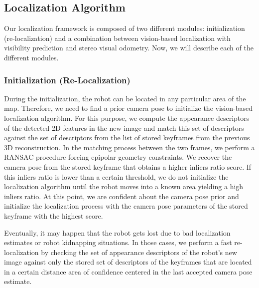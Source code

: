 \documentclass[conference]{IEEEtran}
\begin{document}
\subsection{Localization Algorithm}\label{sec:localization_algorithm}
Our localization framework is composed of two different modules: initialization (re-localization) and a combination between vision-based localization with visibility prediction and stereo visual odometry. Now, we will describe each of the different modules.

\subsubsection{Initialization (Re-Localization)}
During the initialization, the robot can be located in any particular area of the map. Therefore, we need to find a prior camera pose to initialize the vision-based localization algorithm. For this purpose, we compute the appearance descriptors of the detected 2D features in the new image and match this set of descriptors against the set of descriptors from the list of stored keyframes from the previous 3D reconstruction. In the matching process between the two frames, we perform a RANSAC procedure forcing epipolar geometry constraints. We recover the camera pose from the stored keyframe that obtains a higher inliers ratio score. If this inliers ratio is lower than a certain threshold, we do not initialize the localization algorithm until the robot moves into a known area yielding a high inliers ratio. At this point, we are confident about the camera pose prior and initialize the localization process with the camera pose parameters of the stored keyframe with the highest score.

Eventually, it may happen that the robot gets lost due to bad localization estimates or robot kidnapping situations. In those cases, we perform a fast re-localization by checking the set of appearance descriptors of the robot's new image against only the stored set of descriptors of the keyframes that are located in a certain distance area of confidence centered in the last accepted camera pose estimate.

\end{document}
